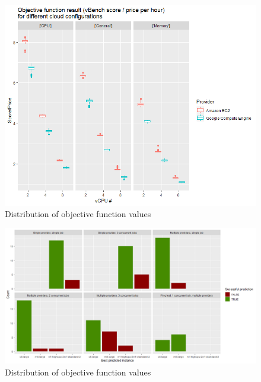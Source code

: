 \documentclass{article}
\begin{document}
\begin{figure}
  \centering
   \includegraphics[scale=0.8]{vbench_values}
   \caption{Distribution of objective function values}
  \label{fig:vBench-values}
\end{figure}
\begin{figure}
  \centering
   \includegraphics[scale=0.8]{bo_results}
   \caption{Distribution of objective function values}
  \label{fig:vBench-values}
\end{figure}
\end{document}

